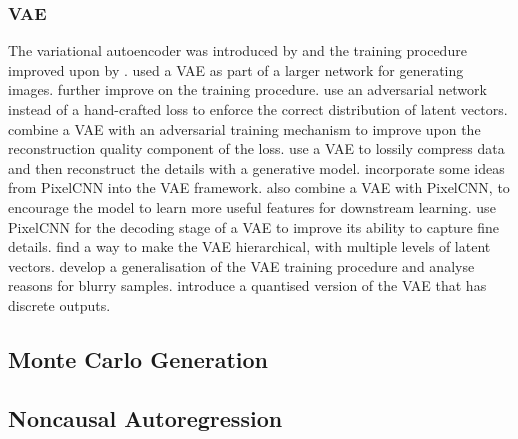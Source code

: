 \documentclass[11pt, a4paper]{book}
\begin{document}
\subsubsection{VAE}

The variational autoencoder was introduced by \citet{vae} and the training procedure improved upon by \citet{vae2}. \citet{drawvae} used a VAE as part of a larger network for generating images. \citet{vaeflows} further improve on the training procedure. \citet{adversarialvae} use an adversarial network instead of a hand-crafted loss to enforce the correct distribution of latent vectors. \citet{vaegan} combine a VAE with an adversarial training mechanism to improve upon the reconstruction quality component of the loss. \citet{vaecompression} use a VAE to lossily compress data and then reconstruct the details with a generative model. \citet{vaeiaf} incorporate some ideas from PixelCNN into the VAE framework. \citet{vaelossy} also combine a VAE with PixelCNN, to encourage the model to learn more useful features for downstream learning. \citet{pixelvae} use PixelCNN for the decoding stage of a VAE to improve its ability to capture fine details. \citet{vaehieararchy} find a way to make the VAE hierarchical, with multiple levels of latent vectors. \citet{vaeunderstanding} develop a generalisation of the VAE training procedure and analyse reasons for blurry samples. \citet{vqvae} introduce a quantised version of the VAE that has discrete outputs.

\subsection{Monte Carlo Generation}

\citet{brnndenoise}

\subsection{Noncausal Autoregression}
\end{document}

